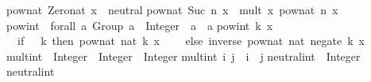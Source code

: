 \begin{isabellebody}
\begin{isamarkuptext}
pow{}nat\ Zero{}nat\ x\ {}\ neutral{}\isanewline
pow{}nat\ {}Suc\ n{}\ x\ {}\ mult\ x\ {}pow{}nat\ n\ x{}{}\isanewline
\isanewline
pow{}int\ {}{}\ forall\ a{}\ {}Group\ a{}\ {}{}\ Integer\ {}{}\ a\ {}{}\ a{}\isanewline
pow{}int\ k\ x\ {}\isanewline
\ \ {}if\ {}\ {}{}\ k\ then\ pow{}nat\ {}nat\ k{}\ x\isanewline
\ \ \ \ else\ inverse\ {}pow{}nat\ {}nat\ {}negate\ k{}{}\ x{}{}{}\isanewline
\isanewline
mult{}int\ {}{}\ Integer\ {}{}\ Integer\ {}{}\ Integer{}\isanewline
mult{}int\ i\ j\ {}\ i\ {}\ j{}\isanewline
\isanewline
neutral{}int\ {}{}\ Integer{}\isanewline
neutral{}int\ {}\ {}{}\isanewline

\end{isamarkuptext}
\end{isabellebody}
